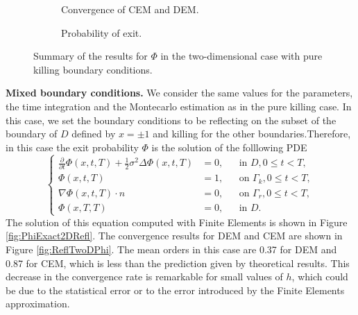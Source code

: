 \begin{figure}[t]
    \centering
    \begin{subfigure}{0.49\linewidth}
        \centering
        \resizebox{1\linewidth}{!}{ }  
        \caption{Convergence of CEM and DEM.}
        \label{fig:KillTwoDPhi}
    \end{subfigure}
    \begin{subfigure}{0.49\linewidth}
        \centering
        \resizebox{1\linewidth}{!}{ }  
        \caption{Probability of exit.}
        \label{fig:PhiExact2DKill}
    \end{subfigure}    
    \caption{Summary of the results for $\Phi$ in the two-dimensional case with pure killing boundary conditions.}
    \label{fig:OrdersTwoDKillPhi}
\end{figure}
\vspace{2mm}
\noindent\textbf{Mixed boundary conditions.} We consider the same values for the parameters, the time integration and the Montecarlo estimation as in the pure killing case. In this case, we set the boundary conditions to be reflecting on the subset of the boundary of $D$ defined by $x = \pm 1$ and killing for the other boundaries.Therefore, in this case the exit probability $\Phi$ is the solution of the folllowing PDE
\begin{equation}\label{eq:PDEPhi2DRefl}
	\left \{
  	\begin{aligned}
	\frac{\partial}{\partial t} \Phi(x,t,T) + \frac{1}{2} \sigma^2 \Delta \Phi(x,t,T) &= 0, && \text{in } D, 0 \leq t < T,\\
	\Phi(x,t,T) &= 1, && \text{on } \Gamma_k, 0 \leq t < T,\\
	\nabla \Phi(x,t,T) \cdot n &= 0, && \text{on } \Gamma_r, 0 \leq t < T,\\
	\Phi(x,T,T) &= 0, && \text{in } D.
  	\end{aligned} \right.
\end{equation}
The solution of this equation computed with Finite Elements is shown in Figure \ref{fig:PhiExact2DRefl}. The convergence results for DEM and CEM are shown in Figure \ref{fig:ReflTwoDPhi}. The mean orders in this case are 0.37 for DEM and 0.87 for CEM, which is less than the prediction given by theoretical results. This decrease in the convergence rate is remarkable for small values of $h$, which could be due to the statistical error or to the error introduced by the Finite Elements approximation.
